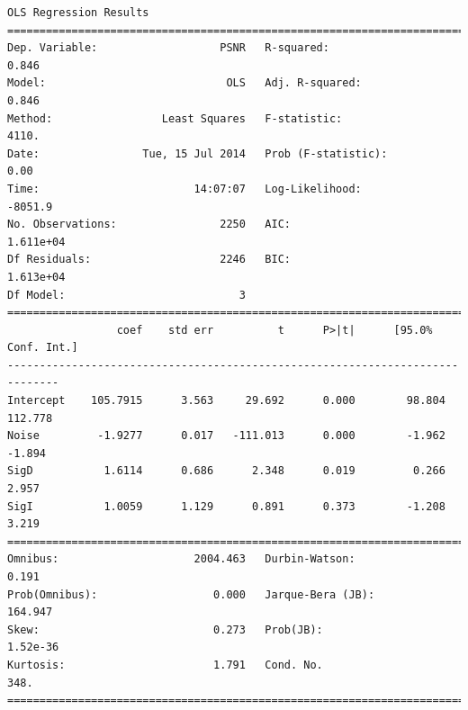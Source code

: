 \documentclass[11pt]{article}
\theoremstyle{definition}
\begin{document}
{\footnotesize
\begin{lstlisting}[caption = Time Series 1 - Bilateral Filter Multiple Iterations OLS Model, label = {itrsamebilateral1}]
                            OLS Regression Results                            
==============================================================================
Dep. Variable:                   PSNR   R-squared:                       0.846
Model:                            OLS   Adj. R-squared:                  0.846
Method:                 Least Squares   F-statistic:                     4110.
Date:                Tue, 15 Jul 2014   Prob (F-statistic):               0.00
Time:                        14:07:07   Log-Likelihood:                -8051.9
No. Observations:                2250   AIC:                         1.611e+04
Df Residuals:                    2246   BIC:                         1.613e+04
Df Model:                           3                                         
==============================================================================
                 coef    std err          t      P>|t|      [95.0% Conf. Int.]
------------------------------------------------------------------------------
Intercept    105.7915      3.563     29.692      0.000        98.804   112.778
Noise         -1.9277      0.017   -111.013      0.000        -1.962    -1.894
SigD           1.6114      0.686      2.348      0.019         0.266     2.957
SigI           1.0059      1.129      0.891      0.373        -1.208     3.219
==============================================================================
Omnibus:                     2004.463   Durbin-Watson:                   0.191
Prob(Omnibus):                  0.000   Jarque-Bera (JB):              164.947
Skew:                           0.273   Prob(JB):                     1.52e-36
Kurtosis:                       1.791   Cond. No.                         348.
==============================================================================
\end{lstlisting}

}
\end{document}
